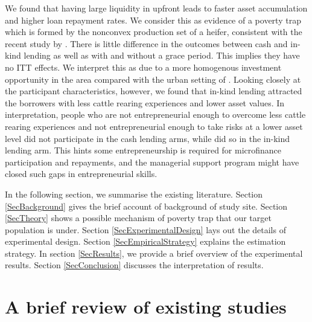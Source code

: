 	We found that having large liquidity in upfront leads to faster asset accumulation and higher loan repayment rates. We consider this as evidence of a poverty trap which is formed by the nonconvex production set of a heifer, consistent with the recent study by \citet{Balboni2020}. There is little difference in the outcomes between cash and in-kind lending as well as with and without a grace period. This implies they have no ITT effects. We interpret this as due to a more homogenous investment opportunity in the area compared with the urban setting of \citet{Field2013}. Looking closely at the participant characteristics, however, we found that in-kind lending attracted the borrowers with less cattle rearing experiences and lower asset values. In interpretation, people who are not entrepreneurial enough to overcome less cattle rearing experiences and not entrepreneurial enough to take risks at a lower asset level did not participate in the cash lending arms, while did so in the in-kind lending arm. This hints some entrepreneurship is required for microfinance participation and repayments, and the managerial support program might have closed such gaps in entrepreneurial skills. 
	

	In the following section, we summarise the existing literature. Section \ref{SecBackground} gives the brief account of background of study site. Section \ref{SecTheory} shows a possible mechanism of poverty trap that our target population is under. Section \ref{SecExperimentalDesign} lays out the details of experimental design. Section \ref{SecEmpiricalStrategy} explains the estimation strategy. In section \ref{SecResults}, we provide a brief overview of the experimental results. Section \ref{SecConclusion} discusses the interpretation of results.

\section{A brief review of existing studies}
\label{SecExistingStudies}

